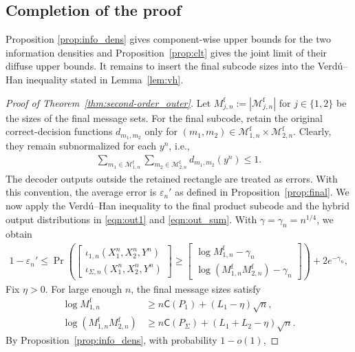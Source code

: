 \documentclass[11pt,onecolumn]{IEEEtran}
\newcommand{\calM}{\mathcal{M}}
\newcommand{\rmf}{\mathrm{f}}
\newcommand{\rvC}{\mathsf{C}}
\newcommand{\eps}{\varepsilon}
\begin{document}
\subsection{Completion of the proof} \label{sec:completion}
Proposition \ref{prop:info_dens} gives component-wise upper bounds for the
two information densities and Proposition~\ref{prop:clt} gives the joint limit of their diffuse
upper bounds. It remains to insert the final subcode sizes into the Verd\'u--Han inequality stated in Lemma~\ref{lem:vh}.

\begin{proof}[Proof of Theorem~\ref{thm:second-order_outer}]
Let $M_{j,n}^\rmf:= |\calM_{j,n}^\rmf|$ for $j \in \{1,2\}$ be the sizes of the final message sets. For the final subcode, retain the original correct-decision functions $d_{m_1,m_2}$ only for $(m_1, m_2) \in \calM_{1,n}^\rmf\times \calM_{2,n}^\rmf$. Clearly, they remain subnormalized for each $y^n$, i.e., 
\begin{align}
    \sum_{ m_1 \in \calM_{1,n}^\rmf} \sum_{ m_2\in \calM_{2,n}^\rmf} d_{m_1,m_2}(y^n)\le 1. 
\end{align}
The decoder outputs outside the retained rectangle are treated   as errors. With
this convention, the average error is  $\eps_n'$ as defined in Proposition~\ref{prop:final}. We now apply the Verd\'u--Han inequality to the final product subcode and the hybrid output distributions in \eqref{eqn:out1} and \eqref{eqn:out_sum}. With $\gamma=\gamma_n=n^{1/4}$,  we obtain
\begin{align}
 1-\eps_n'\le\Pr \left(\begin{bmatrix}
\iota_{1,n} (X_1^n,X_2^n,Y^n) \\ \iota_{\Sigma,n} (X_1^n,X_2^n,Y^n)
\end{bmatrix} \ge \begin{bmatrix}
\log M_{1,n}^\rmf -\gamma_n\\ \log (M_{1,n}^\rmf M_{2,n}^\rmf) -\gamma_n
\end{bmatrix} \right) + 2e^{-\gamma_n}, \label{eqn:vh_final}
\end{align}
Fix $\eta>0$. For large enough $n$, the final message sizes satisfy
\begin{align}
    \log M_{1,n}^\rmf
&\ge n\rvC(P_1)+(L_1-\eta)\sqrt n, \label{eqn:final_standing-rate1}\\
\log (M_{1,n}^\rmf M_{2,n}^\rmf)
&\ge n \rvC(P_\Sigma) 
 +(L_1+L_2-\eta)\sqrt n.\label{eqn:final_standing-rate2}
\end{align}
By Proposition~\ref{prop:info_dens}, with probability $1-o(1)$, 

\end{proof}
\end{document}

